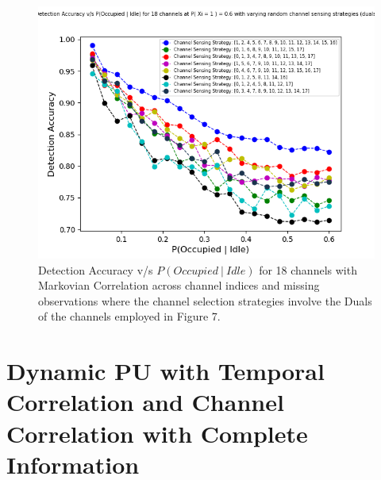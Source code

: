 \documentclass[12pt, draftcls, onecolumn]{IEEEtran}
\begin{document}
\begin{figure}[t]
\includegraphics[width=1.0\textwidth]{Random_Channel_Sensing_Duals.png}
\caption{Detection Accuracy v/s $P(Occupied\ |\ Idle)$ for 18 channels with Markovian Correlation across channel indices and missing observations where the channel selection strategies involve the Duals of the channels employed in Figure 7.}
\label{fig:mesh8}
\centering
\end{figure}
\clearpage
\section{Dynamic PU with Temporal Correlation and Channel Correlation with Complete Information}
\end{document}
